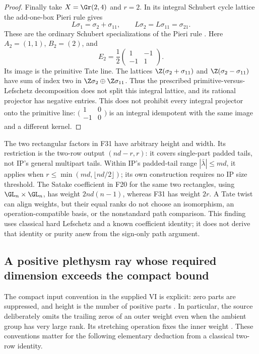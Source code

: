\documentclass[11pt,a4paper]{article}
\renewcommand{\S}{\ensuremath{\mathsection}}
\newcommand{\fid}[1]{\textsf{#1}}\newcommand{\gate}[1]{\textsf{#1}}
\theoremstyle{named}\newtheorem{finding}{Finding}[section]
\theoremstyle{definition}\newtheorem{definition}[finding]{Definition}
\theoremstyle{remark}\newtheorem{remark}[finding]{Remark}
\begin{document}
\begin{proof}
Finally take $X=\Gr(2,4)$ and $r=2$. In its integral Schubert
cycle lattice the add-one-box Pieri rule gives
\[
 L\sigma_1=\sigma_2+\sigma_{11},\qquad
 L\sigma_2=L\sigma_{11}=\sigma_{21}.
\]
These are the ordinary Schubert specializations of the Pieri rule
\cite[Theorem~7.10, p.~16]{Pieri}. Here $A_2=(1,1)$, $B_2=(2)$,
and
\[
 E_2=\frac12
 \begin{pmatrix}1&-1\\-1&1\end{pmatrix}.
\]
Its image is the primitive Tate line. The lattices
$\Z(\sigma_2+\sigma_{11})$ and
$\Z(\sigma_2-\sigma_{11})$ have sum of index two in
$\Z\sigma_2\oplus\Z\sigma_{11}$. Thus the prescribed
primitive-versus-Lefschetz decomposition does not split this
integral lattice, and its rational projector has negative entries.
This does not prohibit every integral projector onto the primitive
line: $\bigl(\begin{smallmatrix}1&0\\-1&0\end{smallmatrix}\bigr)$
is an integral idempotent with the same image and a different kernel.
\end{proof}

The two rectangular factors in \fid{F31} have arbitrary height and
width. Its restriction is the two-row output $(nd-r,r)$: it covers
single-part padded tails, not IP's general multipart tails. Within
IP's padded-tail range $|\bar\lambda|\le md$, it applies when
$r\le\min(md,\lfloor nd/2\rfloor)$; its own construction requires
no IP size threshold. The Satake coefficient in \fid{F20} for the
same two rectangles, using $\GL_n\times\GL_n$, has weight
$2nd(n-1)$, whereas \fid{F31} has weight $2r$. A Tate twist can
align weights, but their equal ranks do not choose an isomorphism,
an operation-compatible basis, or the nonstandard path comparison.
This finding uses classical hard Lefschetz and a known coefficient
identity; it does not derive that identity or purity anew from the
sign-only path argument.


\subsection{A positive plethysm ray whose required dimension exceeds the compact bound}
The compact input convention in the supplied VI is explicit: zero parts
are suppressed, and height is the number of positive parts
\cite[\S1.1, p.~9; opening of \S3.4, p.~53]{VI}.
In particular, the source deliberately omits the trailing zeros of an
outer weight even when the ambient group has very large rank.
Its stretching operation fixes the inner weight
\cite[equation~(1.5), p.~20]{VI}.
These conventions matter for the following elementary deduction from a
classical two-row identity.
\end{document}
